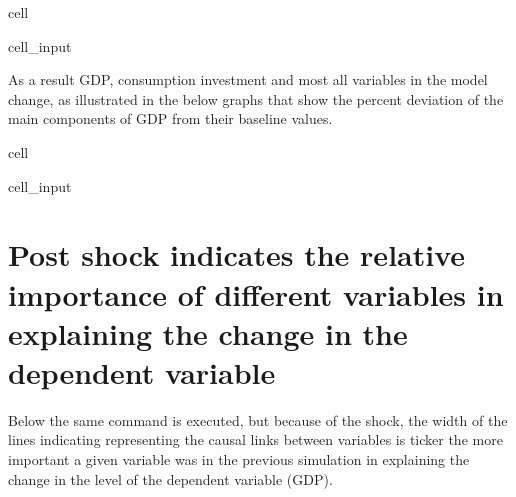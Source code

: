 \documentclass[letterpaper,10pt,english]{jupyterBook}
\begin{document}
\begin{sphinxuseclass}{cell}\begin{sphinxVerbatimInput}

\begin{sphinxuseclass}{cell_input}
\begin{sphinxVerbatim}[commandchars=\\\{\}]
    
   
\end{sphinxVerbatim}

\end{sphinxuseclass}\end{sphinxVerbatimInput}

\end{sphinxuseclass}
\sphinxAtStartPar
As a result GDP, consumption investment and most all variables in the model change, as illustrated in the below graphs that show the percent deviation of the main components of GDP from their baseline values.

\begin{sphinxuseclass}{cell}\begin{sphinxVerbatimInput}

\begin{sphinxuseclass}{cell_input}
\begin{sphinxVerbatim}[commandchars=\\\{\}]
\PYG{p}{[}\PYG{p}{]}
\end{sphinxVerbatim}

\end{sphinxuseclass}\end{sphinxVerbatimInput}

\end{sphinxuseclass}

\section{Post shock  indicates the relative importance of different variables in explaining the change in the dependent variable}
\label{\detokenize{content/06_ModelAnalytics/ModelStructure:post-shock-tracepre-indicates-the-relative-importance-of-different-variables-in-explaining-the-change-in-the-dependent-variable}}
\sphinxAtStartPar
Below the same command is executed, but because of the shock, the width of the lines indicating representing the causal links between variables is ticker the more important a given variable was in the previous simulation in explaining the change in the level of the dependent variable (GDP).
\end{document}
